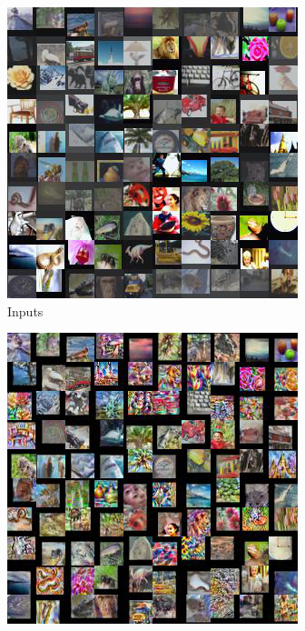 \begin{figure}[hbt!]
\begin{subfigure}{.49\linewidth}\centering
\includegraphics[width=\textwidth]{grids/data_cifar100_arch_ResNet20-4_epoch_200_optim_inversed_mode_aug_auglist_43-18-18_rlabel_False_reaugment_translate_clipped2_ORIGINALS.png}
\caption{Inputs}%
\end{subfigure}%
\hfill
\begin{subfigure}{.49\linewidth}\centering
\includegraphics[width=\textwidth]{grids/data_cifar100_arch_ResNet20-4_epoch_200_optim_inversed_mode_aug_auglist_43-18-18_rlabel_False_reaugment_translate_clipped2_RECONSTRUCTIONS.png}

\end{subfigure}
\end{figure}
